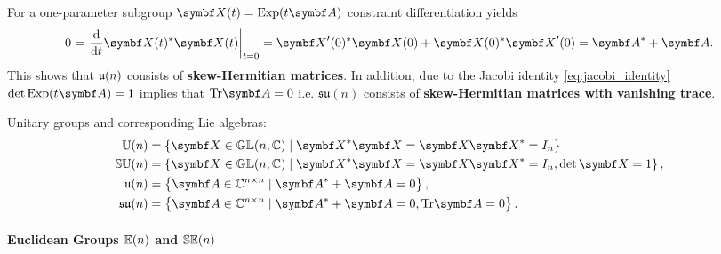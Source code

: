 For a one-parameter subgroup $\X(t) = \Exp(t \A)$ constraint differentiation yields
\begin{equation}
  0 = \left. \frac{\mathrm{d}}{\mathrm{d} t} \X(t)^* \X(t) \right|_{t=0} = \X'(0)^* \X(0) + \X(0)^* \X'(0) = \A^* + \A.
\end{equation}
This shows that ${\mathfrak{u}(n)}$ consists of \textbf{skew-Hermitian matrices}. In addition, due to the Jacobi identity \eqref{eq:jacobi_identity} $\det \Exp(t \A) = 1$ implies that $\tr \A = 0$ i.e. $\mathfrak{su}(n)$ consists of \textbf{skew-Hermitian matrices with vanishing trace}.
\begin{important}
  Unitary groups and corresponding Lie algebras:
  \begin{subequations}
    \begin{align}
      \Un              & = \left\{ \X \in \GL(n, \mathbb{C}) \mid \X^{*} \X = \X \X^{*}= I_{n} \right\}               \\
      \SUn             & = \left\{ \X \in \GL(n, \mathbb{C}) \mid \X^{*} \X = \X \X^{*}= I_{n}, \det \X = 1 \right\}, \\
      \un              & = \left\{ \A \in \mathbb{C}^{n \times n} \mid \A^* + \A = 0 \right\},                        \\
      \mathfrak{su}(n) & = \left\{ \A \in \mathbb{C}^{n \times n} \mid \A^* + \A = 0, \tr \A = 0 \right\}.
    \end{align}
  \end{subequations}
\end{important}

\paragraph{Euclidean Groups ${\mathbb{E}(n)}$ and ${\mathbb{SE}(n)}$}

